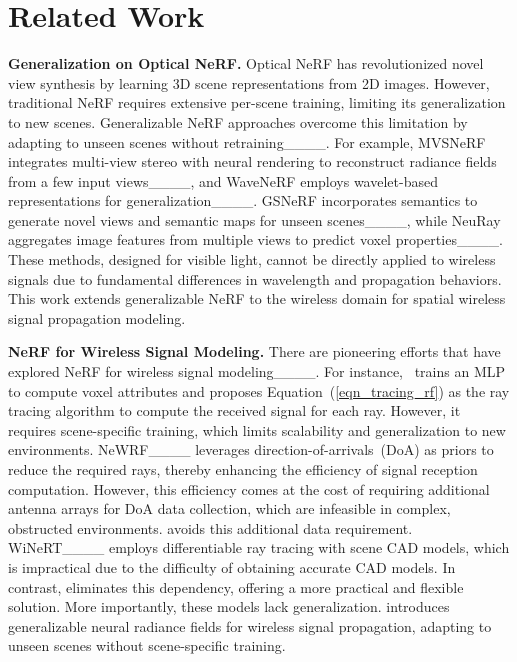 \section{Related Work}
\label{sec_relatedWork}

\textbf{Generalization on Optical NeRF.}  
Optical NeRF has revolutionized novel view synthesis by learning 3D scene representations from 2D images. 
However, traditional NeRF requires extensive per-scene training, limiting its generalization to new scenes. Generalizable NeRF approaches overcome this limitation by adapting to unseen scenes without retraining____. 
For example, MVSNeRF integrates multi-view stereo with neural rendering to reconstruct radiance fields from a few input views____, and WaveNeRF employs wavelet-based representations for generalization____. 
GSNeRF incorporates semantics to generate novel views and semantic maps for unseen scenes____, while NeuRay aggregates image features from multiple views to predict voxel properties____. 
These methods, designed for visible light, cannot be directly applied to wireless signals due to fundamental differences in wavelength and propagation behaviors.
This work extends generalizable NeRF to the wireless domain for spatial wireless signal propagation modeling.


\textbf{NeRF for Wireless Signal Modeling.}
There are pioneering efforts that have explored NeRF for wireless signal modeling____.
For instance, \nerft~trains an MLP to compute voxel attributes and proposes Equation~(\ref{eqn_tracing_rf}) as the ray tracing algorithm to compute the received signal for each ray. 
However, it requires scene-specific training, which limits scalability and generalization to new environments.
NeWRF____ leverages direction-of-arrivals~(DoA) as priors to reduce the required rays, thereby enhancing the efficiency of signal reception computation. 
However, this efficiency comes at the cost of requiring additional antenna arrays for DoA data collection, which are infeasible in complex, obstructed environments.
\ourSystem avoids this additional data requirement.
WiNeRT____ employs differentiable ray tracing with scene CAD models, which is impractical due to the difficulty of obtaining accurate CAD models. 
In contrast, \ourSystem eliminates this dependency, offering a more practical and flexible solution.
More importantly, these models lack generalization. 
\ourSystem introduces generalizable neural radiance fields for wireless signal propagation, adapting to unseen scenes without scene-specific training.